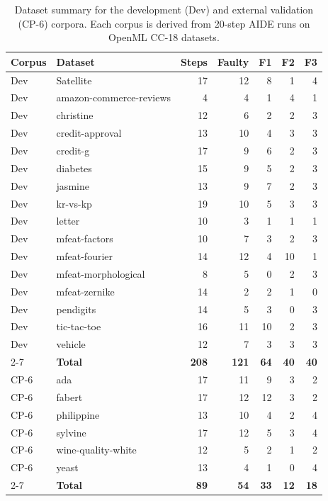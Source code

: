 \begin{table}[htbp]
\centering
\caption{Dataset summary for the development (Dev) and external validation (CP-6) corpora. Each corpus is derived from 20-step AIDE runs on OpenML CC-18 datasets.}
\label{tab:dataset_summary}
\small
\begin{tabular}{llrrrrr}
\toprule
Corpus & Dataset & Steps & Faulty & F1 & F2 & F3 \\
\midrule
Dev & Satellite & 17 & 12 & 8 & 1 & 4 \\
Dev & amazon-commerce-reviews & 4 & 4 & 1 & 4 & 1 \\
Dev & christine & 12 & 6 & 2 & 2 & 3 \\
Dev & credit-approval & 13 & 10 & 4 & 3 & 3 \\
Dev & credit-g & 17 & 9 & 6 & 2 & 3 \\
Dev & diabetes & 15 & 9 & 5 & 2 & 3 \\
Dev & jasmine & 13 & 9 & 7 & 2 & 3 \\
Dev & kr-vs-kp & 19 & 10 & 5 & 3 & 3 \\
Dev & letter & 10 & 3 & 1 & 1 & 1 \\
Dev & mfeat-factors & 10 & 7 & 3 & 2 & 3 \\
Dev & mfeat-fourier & 14 & 12 & 4 & 10 & 1 \\
Dev & mfeat-morphological & 8 & 5 & 0 & 2 & 3 \\
Dev & mfeat-zernike & 14 & 2 & 2 & 1 & 0 \\
Dev & pendigits & 14 & 5 & 3 & 0 & 3 \\
Dev & tic-tac-toe & 16 & 11 & 10 & 2 & 3 \\
Dev & vehicle & 12 & 7 & 3 & 3 & 3 \\
\cmidrule{2-7}
& \textbf{Total} & \textbf{208} & \textbf{121} & \textbf{64} & \textbf{40} & \textbf{40} \\
\midrule
CP-6 & ada & 17 & 11 & 9 & 3 & 2 \\
CP-6 & fabert & 17 & 12 & 12 & 3 & 2 \\
CP-6 & philippine & 13 & 10 & 4 & 2 & 4 \\
CP-6 & sylvine & 17 & 12 & 5 & 3 & 4 \\
CP-6 & wine-quality-white & 12 & 5 & 2 & 1 & 2 \\
CP-6 & yeast & 13 & 4 & 1 & 0 & 4 \\
\cmidrule{2-7}
& \textbf{Total} & \textbf{89} & \textbf{54} & \textbf{33} & \textbf{12} & \textbf{18} \\
\bottomrule
\end{tabular}
\end{table}